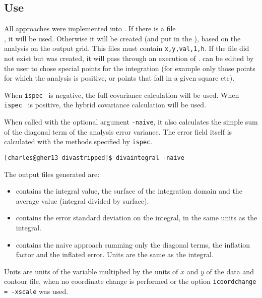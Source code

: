 \subsection{Use}

All approaches were implemented into . If there is a file\\ 
, it will be used.
Otherwise it will be created (and put in the ), based on the analysis on the output grid. This files must contain \texttt{x,y,val,1,h}. If the file did not exist but was created, it will pass through an execution of . 
 can be edited by the user to chose special points for the integration (for example only those points for which the analysis is positive, or points that fall in a given square etc). 

When {\tt ispec } is negative, the full covariance calculation will be used. When {\tt ispec } is positive, the hybrid covariance calculation will be used.

When called with the optional argument \texttt{-naive}, it also calculates the simple sum of the diagonal term of the analysis error variance. The error field itself is calculated with the methods specified by \texttt{ispec}. 

\begin{lstlisting}[style=Bash]
[charles@gher13 divastripped]$ divaintegral -naive
\end{lstlisting}

The output files generated are:
\begin{itemize}
\item {} contains the integral value, the surface of the integration domain and the average value (integral divided by surface).
\item {} contains the error standard deviation on the integral, in the same units as the integral.
\item {} contains the naive approach summing only the diagonal terms, the inflation factor and the inflated error. Units are the same as the integral.
\end{itemize}

Units are units of the variable multiplied by the units of $x$ and $y$ of the data and contour file, when no coordinate change is performed or the option {\tt icoordchange = -xscale} was used.

